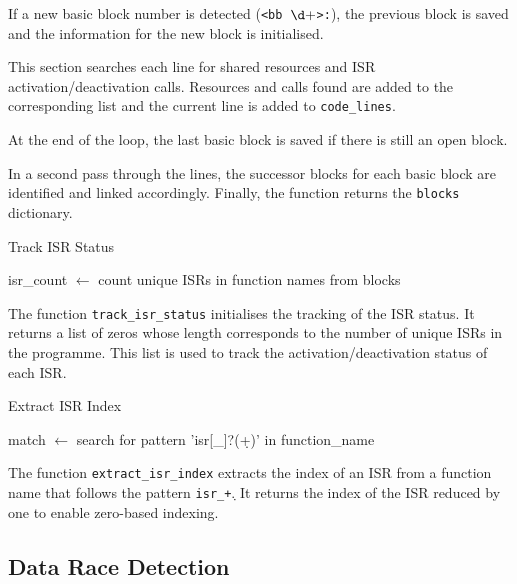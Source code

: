 \documentclass[
fancyheadings, %
%
%
]{stsreprt}
\begin{document}
{If a new basic block number is detected (\texttt{<bb \(\d+\)>:}), the previous block is saved and the information for the new block is initialised.

This section searches each line for shared resources and ISR activation/deactivation calls. Resources and calls found are added to the corresponding list and the current line is added to \texttt{code\_lines}.

At the end of the loop, the last basic block is saved if there is still an open block.

In a second pass through the lines, the successor blocks for each basic block are identified and linked accordingly. Finally, the function returns the \texttt{blocks} dictionary.

\begin{algorithm}[H]
	\caption{Track ISR Status}
	\DontPrintSemicolon
	\SetAlgoLined
	\BlankLine
	isr\_count $\gets$ count unique ISRs in function names from blocks\;
\end{algorithm}

The function \texttt{track\_isr\_status} initialises the tracking of the ISR status. It returns a list of zeros whose length corresponds to the number of unique ISRs in the programme. This list is used to track the activation/deactivation status of each ISR.

\begin{algorithm}[H]
	\caption{Extract ISR Index}
	\DontPrintSemicolon
	\SetAlgoLined
	\BlankLine
	match $\gets$ search for pattern 'isr[\_]?(\d+)' in function\_name\;
\end{algorithm}

The function \texttt{extract\_isr\_index} extracts the index of an ISR from a function name that follows the pattern \texttt{isr\_\d+}. It returns the index of the ISR reduced by one to enable zero-based indexing.

\subsection*{Data Race Detection}

}
\end{document}

